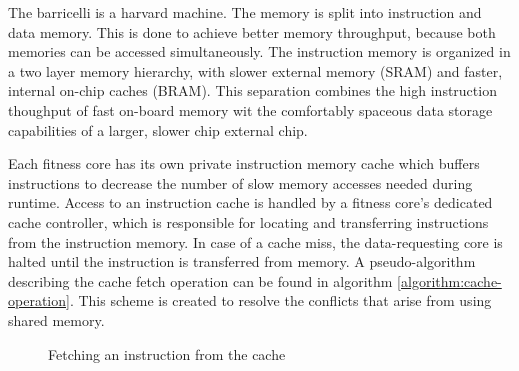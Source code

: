 The \Gls{barricelli} is a \Gls{harvard machine}. \cn
The memory is split into instruction and data memory. 
This is done to achieve better memory throughput, because both memories can be accessed simultaneously.
The instruction memory is organized in a two layer memory hierarchy, with slower external memory (\gls{SRAM}) and faster, internal on-chip caches (\gls{BRAM}).
This separation combines the high instruction thoughput of fast on-board memory wit the comfortably spaceous data storage capabilities of a larger, slower chip external chip.

Each fitness core has its own private instruction memory cache which buffers instructions to decrease the number of slow memory accesses needed during runtime.
Access to an instruction cache is handled by a fitness core's dedicated cache controller, which is responsible for locating and transferring instructions from the instruction memory.
In case of a cache miss, the data-requesting core is halted until the instruction is transferred from memory.
A pseudo-algorithm describing the cache fetch operation can be found in algorithm \vref{algorithm:cache-operation}.
This scheme is created to resolve the conflicts that arise from using shared memory. 

\begin{figure}[H]
\begin{algorithm}[H]
\SetAlgoLined
\DontPrintSemicolon
{}
\Begin{
    \If{$ a = Ca[A \bmod{512}] $}{
        \Return{$ Ci[A \bmod{512}] $}
    }\Else{
        $ Caa \bmod{512}] \longleftarrow a $\;
        $ Ci[a \bmod{512}] \longleftarrow M[a] $\;
        \Return{$ Ci[A \bmod{512}] $}
    }
}
\caption{Fetching an instruction from the cache}
\label{algorithm:cache-operation}
\end{algorithm}
\end{figure}
